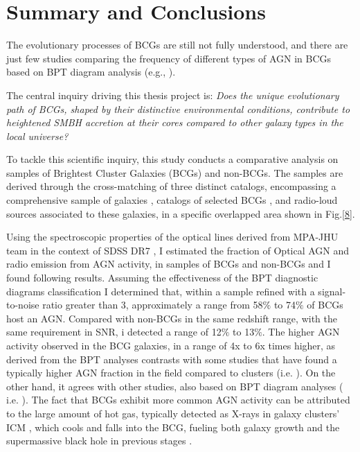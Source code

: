 \chapter*{Summary and Conclusions}

The evolutionary processes of BCGs are still not fully understood, and there are just few
studies comparing the frequency of different types of AGN in BCGs based on BPT diagram analysis (e.g., \cite{2019CoBAO..66..153F}).

The central inquiry driving this thesis project is: \textit{Does the unique evolutionary path of BCGs, shaped by their distinctive environmental conditions, contribute to heightened SMBH accretion at their cores compared to other galaxy types in the local universe?}

To tackle this scientific inquiry, this study conducts a comparative analysis on samples of Brightest Cluster Galaxies (BCGs) and non-BCGs. The samples are derived through the cross-matching of three distinct catalogs, encompassing a comprehensive sample of galaxies \cite{2009ApJS..182..543A}, catalogs of selected BCGs  \cite{2009yCat..73790867V}, and radio-loud sources \cite{2005MNRAS.362....9B} associated to these galaxies, in a specific overlapped area shown in Fig.\ref{8}.

Using the spectroscopic properties of the optical lines derived from MPA-JHU team in the context of SDSS DR7 \cite{mpa-sdss-dr7, 2009ApJS..182..543A}, I estimated the fraction of Optical AGN and radio emission from AGN activity, in samples of BCGs and non-BCGs and I found following results.
Assuming the effectiveness of the BPT diagnostic diagrams classification I determined that, within a sample refined with a signal-to-noise ratio greater than 3, approximately a range from 58$\%$ to 74$\%$ of BCGs host an AGN.
Compared with non-BCGs in the same redshift range, with the same requirement in SNR, i detected a range of 12$\%$ to 13$\%$.
The higher AGN activity observed in the BCG galaxies, in a range of 4x to 6x times higher, as derived from the BPT analyses contrasts with some studies that have found a typically higher AGN fraction in the field compared to clusters (i.e. \cite{2017MNRAS.472..409L}).  On the other hand, it agrees with other studies, also based on BPT diagram analyses ( i.e. \cite{2012A&A...538A..15H}).  The fact that BCGs exhibit more common AGN activity can be attributed to the large amount of hot gas, typically detected as X-rays in galaxy clusters' ICM , which cools and falls into the BCG, fueling both galaxy growth and the supermassive black hole in previous stages \cite{2012A&A...538A..15H}. 

